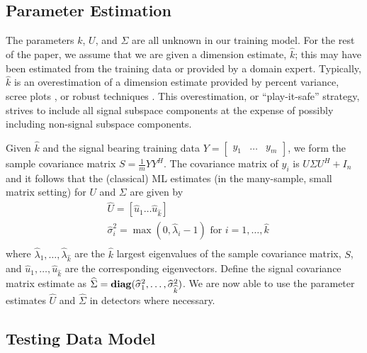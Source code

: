 \subsection{Parameter Estimation}\label{sec:param_estim}

The parameters $k$, $U$, and $\Sigma$ are all unknown in our training model. For the rest of the paper, we assume that we are given a dimension estimate, $\widehat{k}$; this may have been estimated from the training data or provided by a domain expert. Typically, $\widehat{k}$ is an overestimation of a dimension estimate provided by percent variance, scree plots \cite{zhu2006automatic}, or robust techniques \cite{nadakuditi2010fundamental,johnstone2001distribution,el2007tracy}. This overestimation, or ``play-it-safe'' strategy, strives to include all signal subspace components at the expense of possibly including non-signal subspace components.

Given $\widehat{k}$ and the signal bearing training data $Y = \begin{bmatrix} y_1 & \dots & y_m \end{bmatrix}$, we form the sample covariance matrix $S=\frac{1}{m}YY^{H}$. The covariance matrix of $y_i$ is $U\Sigma U^H +I_n$ and it follows that the (classical) ML estimates (in the many-sample, small matrix setting) for $U$ and $\Sigma$ are given by \cite{muirhead1982aspects}
\begin{equation}\label{eq:param_estims_stoch}
\begin{aligned}
&\widehat{U}=[\widehat{u}_1 \dots \widehat{u}_{\widehat{k}}]\\
&\widehat{\sigma}_i^2 = \max(0,\widehat{\lambda}_i -1) \text{ for } i=1,\dots,\widehat{k}\\
\end{aligned}
\end{equation}
where $\widehat{\lambda}_1,\dots,\widehat{\lambda}_{\widehat{k}}$ are the $\widehat{k}$  largest eigenvalues of the sample covariance matrix, $S$, and $\widehat{u}_1,\dots,\widehat{u}_{\widehat{k}}$ are the corresponding eigenvectors. Define the signal covariance matrix estimate as $\widehat{\Sigma}=\mathop{\bf diag}(\widehat{\sigma}_1^2,\dots,\widehat{\sigma}_{\widehat{k}}^2)$. We are now able to use the parameter estimates $\widehat{U}$ and $\widehat{\Sigma}$ in detectors where necessary.

\subsection{Testing Data Model}

